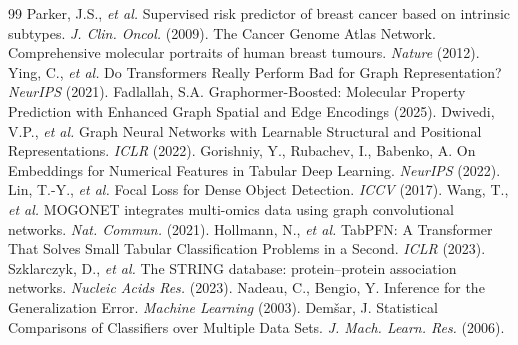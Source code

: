 \documentclass[10pt, twocolumn]{article}
\begin{document}
\normalsize
\begin{thebibliography}{99}
\small
{} Parker, J.S., \textit{et al.} Supervised risk predictor
of breast cancer based on intrinsic subtypes. \textit{J. Clin. Oncol.} (2009).
 The Cancer Genome Atlas Network. Comprehensive molecular
portraits of human breast tumours. \textit{Nature} (2012).
 Ying, C., \textit{et al.} Do Transformers Really
Perform Bad for Graph Representation? \textit{NeurIPS} (2021).
 Fadlallah, S.A. Graphormer-Boosted: Molecular Property
Prediction with Enhanced Graph Spatial and Edge Encodings (2025).
 Dwivedi, V.P., \textit{et al.} Graph Neural Networks with
Learnable Structural and Positional Representations. \textit{ICLR} (2022).
 Gorishniy, Y., Rubachev, I., Babenko, A. On Embeddings for
Numerical Features in Tabular Deep Learning. \textit{NeurIPS} (2022).
 Lin, T.-Y., \textit{et al.} Focal Loss for Dense Object
Detection. \textit{ICCV} (2017).
 Wang, T., \textit{et al.} MOGONET integrates multi-omics
data using graph convolutional networks. \textit{Nat. Commun.} (2021).
 Hollmann, N., \textit{et al.} TabPFN: A Transformer
That Solves Small Tabular Classification Problems in a Second. \textit{ICLR} (2023).
 Szklarczyk, D., \textit{et al.} The STRING database:
protein--protein association networks. \textit{Nucleic Acids Res.} (2023).
 Nadeau, C., Bengio, Y. Inference for the Generalization Error.
\textit{Machine Learning} (2003).
 Dem\v{s}ar, J. Statistical Comparisons of Classifiers over
Multiple Data Sets. \textit{J. Mach. Learn. Res.} (2006).
\end{thebibliography}
\end{document}

